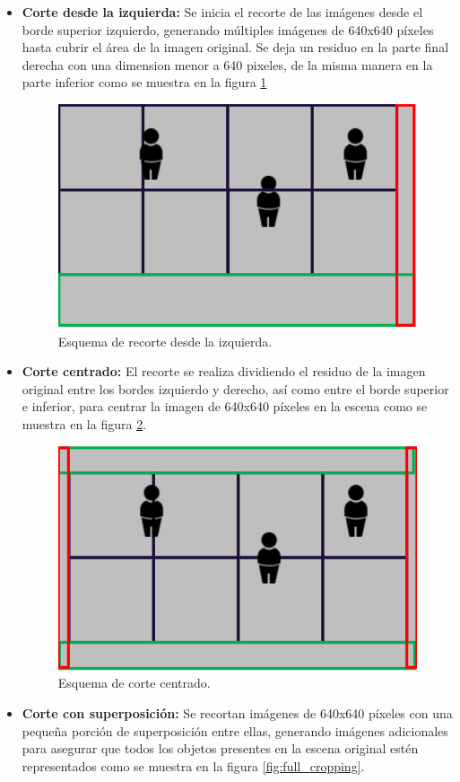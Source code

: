 \begin{itemize}
  \item \textbf{Corte desde la izquierda:} Se inicia el recorte de las imágenes desde el borde superior izquierdo, generando múltiples imágenes de 640x640 píxeles hasta cubrir el área de la imagen original. Se deja un residuo en la parte final derecha con una dimension menor a 640 pixeles, de la misma manera en la parte inferior como se muestra en la figura \ref{fig:left_cropping}

\begin{figure}[!ht]
  \centering
  \includegraphics[width=.49\linewidth]{images/left_cropping.png}
  \caption{Esquema de recorte desde la izquierda.}
  \label{fig:left_cropping}
\end{figure}

\item \textbf{Corte centrado:} El recorte se realiza dividiendo el residuo de la imagen original entre los bordes izquierdo y derecho, así como entre el borde superior e inferior, para centrar la imagen de 640x640 píxeles en la escena como se muestra en la figura \ref{fig:center_cropping}.

\begin{figure}[!ht]
  \centering
  \includegraphics[width=.49\linewidth]{images/center_cropping.png}
  \caption{Esquema de corte centrado.}
  \label{fig:center_cropping}
\end{figure}

\item \textbf{Corte con superposición:} Se recortan imágenes de 640x640 píxeles con una pequeña porción de superposición entre ellas, generando imágenes adicionales para asegurar que todos los objetos presentes en la escena original estén representados como se muestra en la figura \ref{fig:full_cropping}.


\end{itemize}
